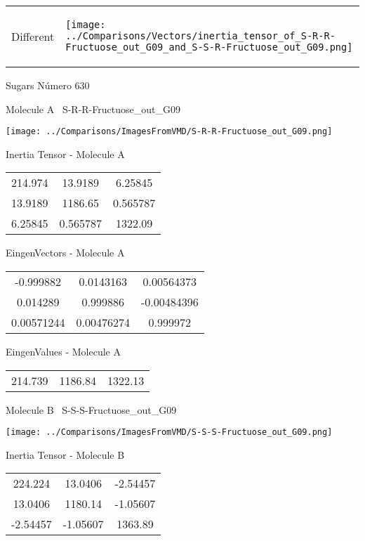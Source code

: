 \vtab[-5mm]
\begin{tabular}{*{2}{m{}}}
\begin{center}
\textcolor{NavyBlue}{\Large Different}
\end{center}
&
\begin{center}
\texttt{[image: ../Comparisons/Vectors/inertia\_tensor\_of\_S-R-R-Fructuose\_out\_G09\_and\_S-S-R-Fructuose\_out\_G09.png]}
\end{center}
\end{tabular}

 \newpage

\vtab[-3cm]
\begin{center}
{\large Sugars \tab Número 630}
\end{center}
\begin{multicols}{2}
\begin{center}

Molecule A \
S-R-R-Fructuose\_out\_G09

\texttt{[image: ../Comparisons/ImagesFromVMD/S-R-R-Fructuose\_out\_G09.png]}

Inertia Tensor - Molecule A \\
\begin{tabular}{|c c c|}
214.974	 & 	13.9189	 & 	6.25845	 \\
13.9189	 & 	1186.65	 & 	0.565787	 \\
6.25845	 & 	0.565787	 & 	1322.09
\end{tabular}

\vtab
 EingenVectors - Molecule A     \\
\begin{tabular}{|c c c|}
-0.999882	 & 	0.0143163	 & 	0.00564373	 \\
0.014289	 & 	0.999886	 & 	-0.00484396	 \\
0.00571244	 & 	0.00476274	 & 	0.999972
\end{tabular}

\vtab
 EingenValues - Molecule A     \\
\begin{tabular}{|c c c|}
214.739	 & 	1186.84	 & 	1322.13	 \\
\end{tabular}
\columnbreak

Molecule B \
S-S-S-Fructuose\_out\_G09

\texttt{[image: ../Comparisons/ImagesFromVMD/S-S-S-Fructuose\_out\_G09.png]}

Inertia Tensor - Molecule B \\
\begin{tabular}{|c c c|}
224.224	 & 	13.0406	 & 	-2.54457	 \\
13.0406	 & 	1180.14	 & 	-1.05607	 \\
-2.54457	 & 	-1.05607	 & 	1363.89
\end{tabular}


\end{center}
\end{multicols}

